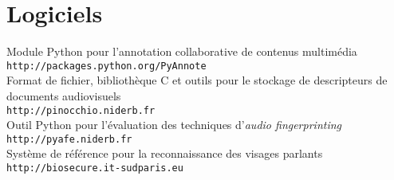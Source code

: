 \section{Logiciels}

Module Python pour l'annotation collaborative de contenus multim\'{e}dia\\
\texttt{\small http://packages.python.org/PyAnnote}\\

Format de fichier, biblioth\`{e}que C et outils pour le stockage de descripteurs de documents audiovisuels\\
\texttt{\small http://pinocchio.niderb.fr}\\

Outil Python pour l'\'{e}valuation des techniques d'\emph{audio fingerprinting}\\
\texttt{\small http://pyafe.niderb.fr} \cite{Ramona2011}\\

Syst\`{e}me de r\'{e}f\'{e}rence pour la reconnaissance des visages parlants\\
\texttt{\small http://biosecure.it-sudparis.eu} \cite{Bredin2006a}
